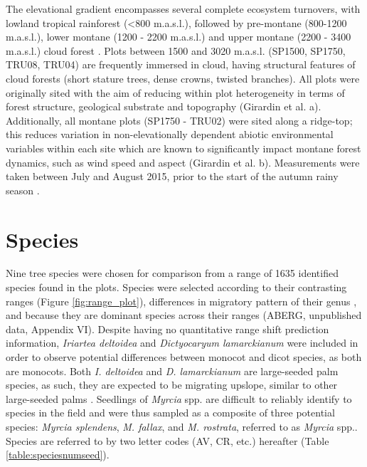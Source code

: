 \documentclass[a4paper,10pt,]{report}
\begin{document}
The elevational gradient encompasses several complete ecosystem turnovers, with lowland tropical rainforest (<800 m.a.s.l.), followed by pre-montane (800-1200 m.a.s.l.), lower montane (1200 - 2200 m.a.s.l.) and upper montane (2200 - 3400 m.a.s.l.) cloud forest \citep{Girardin2010}. Plots between 1500 and 3020 m.a.s.l. (SP1500, SP1750, TRU08, TRU04) are frequently immersed in cloud, having structural features of cloud forests (short stature trees, dense crowns, twisted branches). All plots were originally sited with the aim of reducing within plot heterogeneity in terms of forest structure, geological substrate and topography (Girardin et al. \citeyear{Girardin2013b}a). Additionally, all montane plots (SP1750 - TRU02) were sited along a ridge-top; this reduces variation in non-elevationally dependent abiotic environmental variables within each site which are known to significantly impact montane forest dynamics, such as wind speed and aspect (Girardin et al. \citeyear{Girardin2013a}b). Measurements were taken between July and August 2015, prior to the start of the autumn rainy season \citep{Garreaud2009}. 
 
\section{Species}
Nine tree species were chosen for comparison from a range of 1635 identified species found in the plots. Species were selected according to their contrasting ranges (Figure \ref{fig:range_plot}), differences in migratory pattern of their genus \citep{Feeley2011}, and because they are dominant species across their ranges (ABERG, unpublished data, Appendix VI). Despite having no quantitative range shift prediction information, \textit{Iriartea deltoidea} and \textit{Dictyocaryum lamarckianum} were included in order to observe potential differences between monocot and dicot species, as both are monocots. Both \textit{I. deltoidea} and \textit{D. lamarckianum} are large-seeded palm species, as such, they are expected to be migrating upslope, similar to other large-seeded palms \citep{Hillyer2010}. Seedlings of \textit{Myrcia} spp. are difficult to reliably identify to species in the field and were thus sampled as a composite of three potential species: \textit{Myrcia splendens}, \textit{M. fallax}, and \textit{M. rostrata}, referred to as \textit{Myrcia} spp.. Species are referred to by two letter codes (AV, CR, etc.) hereafter (Table \ref{table:speciesnumseed}).\\
\end{document}

